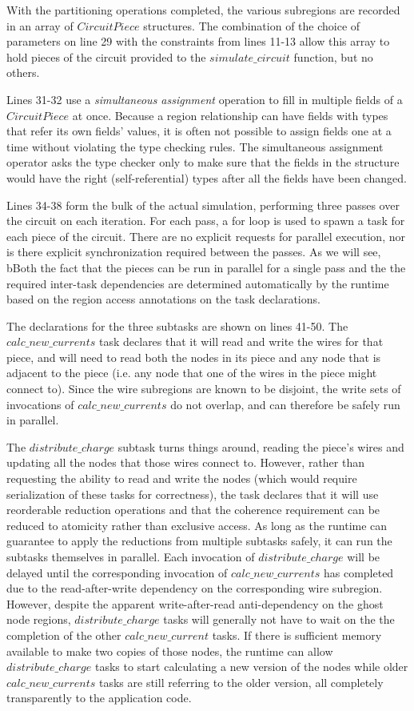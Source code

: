 With the partitioning operations completed, the various subregions are
recorded in an array of $CircuitPiece$ structures.  The combination of the
choice of parameters on line 29 with the constraints from lines 11-13 allow 
this array to hold pieces of the circuit provided to the $simulate\_circuit$
function, but no others.

Lines 31-32 use a \emph{simultaneous assignment} operation to fill in multiple
fields of a $CircuitPiece$ at once.  Because a region relationship can have
fields with types that refer its own fields' values, it is often not possible
to assign fields one at a time without violating the type checking rules.
The simultaneous assignment operator asks the type checker only to make sure
that the fields in the structure would have the right (self-referential) types
after all the fields have been changed.

Lines 34-38 form the bulk of the actual simulation, performing three passes
over the circuit on each iteration.  For each pass, a for loop is used to 
spawn a task for each piece of the circuit.  There are no explicit requests for
parallel execution, nor is there explicit synchronization required between the
passes.  As we will see, bBoth the fact that the pieces can be run in parallel
for a single 
pass and the the required inter-task dependencies are determined automatically
by the runtime based on the region access annotations on the task declarations.

The declarations for the three subtasks are shown on lines 41-50.  The 
$calc\_new\_currents$ task declares that it will read and write the wires
for that piece, and will need to read both the nodes in its piece and any
node that is adjacent to the piece (i.e. any node that one of the wires in the
piece might connect to).  Since the wire subregions are known to be disjoint,
the write sets of invocations of $calc\_new\_currents$ do not overlap, and can
therefore be safely run in parallel.

The $distribute\_charge$ subtask turns things around, reading the piece's 
wires and updating all the nodes that those wires connect to.  However,
rather than requesting the ability to read and write the nodes (which would
require serialization of these tasks for correctness), the task declares that
it will use reorderable reduction operations and that the coherence requirement
can be reduced to atomicity rather than exclusive access.  As long as the
runtime can guarantee to apply the reductions from multiple subtasks safely, it
can run the subtasks themselves in parallel.  Each invocation of 
$distribute\_charge$ will be delayed until the corresponding invocation of 
$calc\_new\_currents$ has completed due to the read-after-write dependency on
the corresponding wire subregion.  However, despite the apparent 
write-after-read anti-dependency on the ghost node regions, $distribute\_charge$
tasks will generally not have to wait on the the completion of the other
$calc\_new\_current$ tasks.  If there is sufficient memory available to make
two copies of those nodes, the runtime can allow $distribute\_charge$ tasks to
start calculating a new version of the nodes while older $calc\_new\_currents$
tasks are still referring to the older version, all completely transparently to
the application code.

